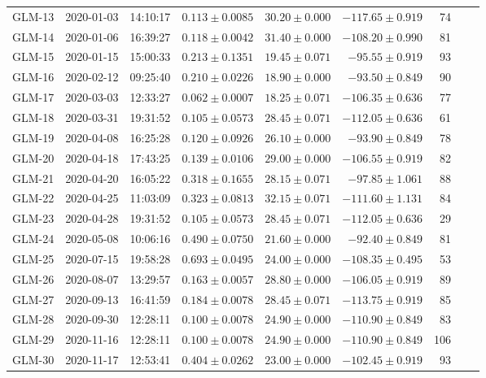 \begin{table}
\begin{tabular}{rrrrrrrrr}
GLM-13 & 2020-01-03 & 14:10:17 & $0.113\pm 0.0085$ & $30.20 \pm 0.000$ & $-117.65 \pm  0.919$ & 74           \\
GLM-14 & 2020-01-06 & 16:39:27 & $0.118\pm 0.0042$ & $31.40 \pm 0.000$ & $-108.20 \pm  0.990$ & 81           \\
GLM-15 & 2020-01-15 & 15:00:33 & $0.213\pm 0.1351$ & $19.45 \pm 0.071$ & $-95.55 \pm   0.919$ & 93           \\
GLM-16 & 2020-02-12 & 09:25:40 & $0.210\pm 0.0226$ & $18.90 \pm 0.000$ & $-93.50 \pm   0.849$ & 90           \\
GLM-17 & 2020-03-03 & 12:33:27 & $0.062\pm 0.0007$ & $18.25 \pm 0.071$ & $-106.35 \pm  0.636$ & 77           \\
GLM-18 & 2020-03-31 & 19:31:52 & $0.105\pm 0.0573$ & $28.45 \pm 0.071$ & $-112.05 \pm  0.636$ & 61           \\
GLM-19 & 2020-04-08 & 16:25:28 & $0.120\pm 0.0926$ & $26.10 \pm 0.000$ & $-93.90 \pm   0.849$ & 78           \\
GLM-20 & 2020-04-18 & 17:43:25 & $0.139\pm 0.0106$ & $29.00 \pm 0.000$ & $-106.55 \pm  0.919$ & 82           \\
GLM-21 & 2020-04-20 & 16:05:22 & $0.318\pm 0.1655$ & $28.15 \pm 0.071$ & $-97.85 \pm   1.061$ & 88           \\
GLM-22 & 2020-04-25 & 11:03:09 & $0.323\pm 0.0813$ & $32.15 \pm 0.071$ & $-111.60 \pm  1.131$ & 84           \\
GLM-23 & 2020-04-28 & 19:31:52 & $0.105\pm 0.0573$ & $28.45 \pm 0.071$ & $-112.05 \pm  0.636$ & 29           \\
GLM-24 & 2020-05-08 & 10:06:16 & $0.490\pm 0.0750$ & $21.60 \pm 0.000$ & $-92.40 \pm   0.849$ & 81           \\
GLM-25 & 2020-07-15 & 19:58:28 & $0.693\pm 0.0495$ & $24.00 \pm 0.000$ & $-108.35 \pm  0.495$ & 53           \\
GLM-26 & 2020-08-07 & 13:29:57 & $0.163\pm 0.0057$ & $28.80 \pm 0.000$ & $-106.05 \pm  0.919$ & 89           \\
GLM-27 & 2020-09-13 & 16:41:59 & $0.184\pm 0.0078$ & $28.45 \pm 0.071$ & $-113.75 \pm  0.919$ & 85           \\
GLM-28 & 2020-09-30 & 12:28:11 & $0.100\pm 0.0078$ & $24.90 \pm 0.000$ & $-110.90 \pm  0.849$ & 83           \\
GLM-29 & 2020-11-16 & 12:28:11 & $0.100\pm 0.0078$ & $24.90 \pm 0.000$ & $-110.90 \pm  0.849$ &106           \\
GLM-30 & 2020-11-17 & 12:53:41 & $0.404\pm 0.0262$ & $23.00 \pm 0.000$ & $-102.45 \pm  0.919$ & 93           \\

\end{tabular}
\end{table}
